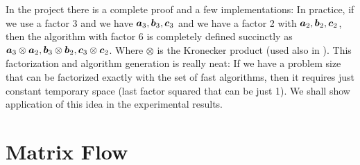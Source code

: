 \documentclass[acmsmall]{acmart}
\begin{document}
In the project there is a complete proof and a few implementations: In
practice, if we use a factor 3 and we have ${\boldsymbol a}_3, {\boldsymbol b}_3,
{\boldsymbol c}_3$ and we have a factor 2 with ${\boldsymbol a}_2, {\boldsymbol b}_2, {\boldsymbol c}_2$,
then the algorithm with factor 6 is completely defined succinctly as
${\boldsymbol a}_3 \otimes {\boldsymbol a}_2, {\boldsymbol b}_3 \otimes {\boldsymbol b}_2, {\boldsymbol c}_3
\otimes {\boldsymbol c}_2$. Where $\otimes$ is the Kronecker product (used also
in \cite{PMID:36198780}). This factorization and algorithm generation
is really neat: If we have a problem size that can be factorized
exactly with the set of fast algorithms, then it requires just
constant temporary space (last factor squared that can be just 1). We
shall show application of this idea in the experimental results.
\newpage 
\section{Matrix Flow}
\label{sec:matrixflow}
\end{document}
